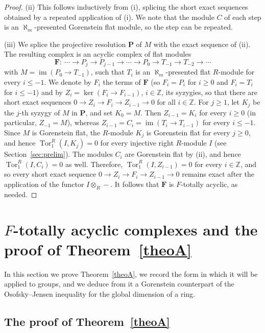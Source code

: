 \documentclass[12pt]{amsart}
\theoremstyle{remark}
\theoremstyle{definition}
\theoremstyle{plain}
\DeclareMathOperator{\Tor}{Tor}
\DeclareMathOperator{\im}{im}
\newcommand{\alephm}{\aleph_m}
\begin{document}
\begin{proof}
(ii) This follows inductively from (i), splicing the short exact sequences obtained by a repeated application of (i). We note that the module $C$ of each step is an $\alephm$-presented Gorenstein flat module, so the step can be repeated.

(iii) We splice the projective resolution $\mathbf P$ of $M$ with the exact sequence of (ii). The resulting complex is an acyclic complex of flat modules \[\mathbf F:\ \cdots\rightarrow P_{j} \rightarrow P_{j-1}\rightarrow \cdots \rightarrow P_0\to T_{-1}\to T_{-2}\to\cdots\] with $M=\im(P_0\to T_{-1})$, such that $T_i$ is an $\alephm$-presented flat $R$-module for every $i\le-1$. We denote by $F_i$ the terms of $\mathbf F$ (so $F_i=P_i$ for $i\ge0$ and $F_i=T_i$ for $i\le-1$) and by $Z_i=\ker(F_i\to F_{i-1})$, $i\in\mathbb{Z}$, its syzygies, so that there are short exact sequences $0\to Z_i\to F_i\to Z_{i-1}\to0$ for all $i\in\mathbb{Z}$. For $j\ge1$, let $K_j$ be the $j$-th syzygy of $M$ in $\mathbf P$, and set $K_0=M$. Then $Z_{i-1}=K_i$ for every $i\ge0$ (in particular, $Z_{-1}=M$), whereas $Z_{i-1}=C_i=\im(T_i\to T_{i-1})$ for every $i\le-1$. Since $M$ is Gorenstein flat, the $R$-module $K_j$ is Gorenstein flat for every $j\geq 0$, and hence $\Tor_1^R(I,K_j)=0$ for every injective right $R$-module $I$ (see Section~\ref{sec:prelim}). The modules $C_i$ are Gorenstein flat by (ii), and hence $\Tor_1^R(I,C_i)=0$ as well. Therefore, $\Tor_1^R(I,Z_{i-1})=0$ for every $i\in\mathbb{Z}$, and so every short exact sequence $0\to Z_i\to F_i\to Z_{i-1}\to0$ remains exact after the application of the functor $I\otimes_R-$. It follows that $\mathbf F$ is $F$-totally acyclic, as needed.
\end{proof}

\section{\texorpdfstring{$F$}{F}-totally acyclic complexes and the proof of Theorem~\texorpdfstring{\ref{theoA}}{A}}\label{sec:cover}

In this section we prove Theorem~\ref{theoA}, we record the form in which it will be applied to groups, and we deduce from it a Gorenstein counterpart of the Osofsky--Jensen inequality for the global dimension of a ring.

\subsection{\texorpdfstring{The proof of Theorem~\ref{theoA}}{The proof of Theorem A}}
\end{document}

